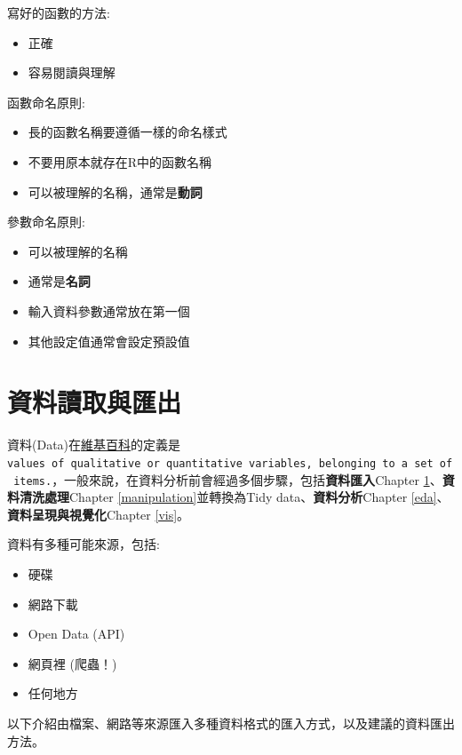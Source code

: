 \documentclass[]{book}
\providecommand{\tightlist}{%
  \setlength{\itemsep}{0pt}\setlength{\parskip}{0pt}}
\theoremstyle{definition}
\theoremstyle{definition}
\theoremstyle{remark}
\begin{document}
寫好的函數的方法:

\begin{itemize}
\tightlist
\item
  正確
\item
  容易閱讀與理解
\end{itemize}

函數命名原則:

\begin{itemize}
\tightlist
\item
  長的函數名稱要遵循一樣的命名樣式
\item
  不要用原本就存在R中的函數名稱
\item
  可以被理解的名稱，通常是\textbf{動詞}
\end{itemize}

參數命名原則:

\begin{itemize}
\tightlist
\item
  可以被理解的名稱
\item
  通常是\textbf{名詞}
\item
  輸入資料參數通常放在第一個
\item
  其他設定值通常會設定預設值
\end{itemize}

\chapter{資料讀取與匯出}\label{io}

資料(Data)在\href{http://en.wikipedia.org/wiki/Data}{維基百科}的定義是\texttt{values\ of\ qualitative\ or\ quantitative\ variables,\ belonging\ to\ a\ set\ of\ items.}，一般來說，在資料分析前會經過多個步驟，包括\textbf{資料匯入}Chapter
\ref{io}、\textbf{資料清洗處理}Chapter \ref{manipulation}並轉換為Tidy
data、\textbf{資料分析}Chapter
\ref{eda}、\textbf{資料呈現與視覺化}Chapter \ref{vis}。

資料有多種可能來源，包括:

\begin{itemize}
\tightlist
\item
  硬碟
\item
  網路下載
\item
  Open Data (API)
\item
  網頁裡 (爬蟲！)
\item
  任何地方
\end{itemize}

以下介紹由檔案、網路等來源匯入多種資料格式的匯入方式，以及建議的資料匯出方法。
\end{document}

